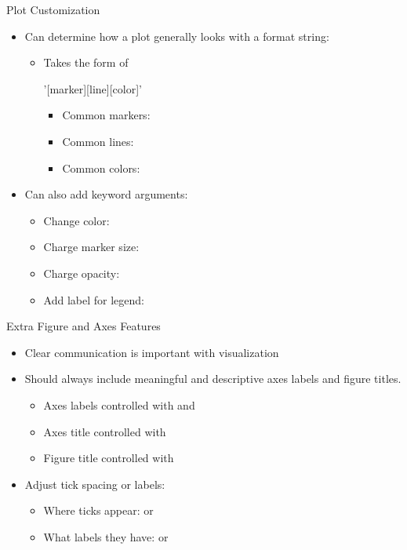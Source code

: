 \documentclass[pdf, aspectratio=169, 12pt]{beamer}
\begin{document}
\begin{frame}[fragile]{Plot Customization}
	\begin{itemize}
		\item Can determine how a plot generally looks with a format string:
			\begin{itemize}
				\item Takes the form of
					\begin{pythoncode}
						'[marker][line][color]'
					\end{pythoncode}
					\begin{itemize}
						\item Common markers:   
						\item Common lines:   \pyi{- -- :}
						\item Common colors:   
					\end{itemize}
					
			\end{itemize}
		\item Can also add keyword arguments:
			\begin{itemize}
				\item Change color: 
				\item Charge marker size: 
				\item Charge opacity: 
				\item Add label for legend: 
			\end{itemize}
			
			
	\end{itemize}
	
\end{frame}


\begin{frame}{Extra Figure and Axes Features}
	\begin{itemize}
		\item Clear communication is important with visualization
		\item Should always include meaningful and descriptive axes labels and figure titles.%
			\begin{itemize}
				\item Axes labels controlled with  and 
				\item Axes title controlled with 
				\item Figure title controlled with 
			\end{itemize}
		\item Adjust tick spacing or labels:
			\begin{itemize}
				\item Where ticks appear:  or 
				\item What labels they have:  or 
			\end{itemize}
	\end{itemize}
\end{frame}
\end{document}
